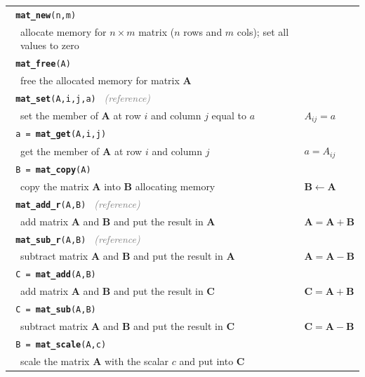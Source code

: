 \documentclass[10pt]{article}
\begin{document}
\begin{longtable}{@{} p{1.5cm} p{7cm} p{3cm} @{}}
\toprule
\multicolumn{2}{l}{\texttt{ \textbf{mat\_new}(n,m) }} \\
& allocate memory for $n\times m$ matrix ($n$ rows and $m$ cols); set all values to zero & \\
\hline
\multicolumn{2}{l}{\texttt{ \textbf{mat\_free}(A)} } \\
& free the allocated memory for matrix $\mathbf{A}$ & \\
\hline
\multicolumn{2}{l}{\texttt{ \textbf{mat\_set}(A,i,j,a) } \hfill \textit{\textcolor{gray}{(reference)}}} \\
& set the member of $\mathbf{A}$ at row $i$ and column $j$ equal to $a$ &
$A_{ij}=a$ \\
\hline
\multicolumn{2}{l}{\texttt{ a = \textbf{mat\_get}(A,i,j) }} \\
& get the member of $\mathbf{A}$ at row $i$ and column $j$ &
$a=A_{ij}$ \\
\hline
\multicolumn{2}{l}{\texttt{ B = \textbf{mat\_copy}(A) }} \\
& copy the matrix $\mathbf{A}$ into $\mathbf{B}$ allocating memory & 
$\mathbf{B} \gets \mathbf{A}$ \\
\hline
\multicolumn{2}{l}{\texttt{ \textbf{mat\_add\_r}(A,B) } \hfill \textit{\textcolor{gray}{(reference)}}} \\
& add matrix $\mathbf{A}$ and $\mathbf{B}$ and put the result in $\mathbf{A}$ &
$\mathbf{A}=\mathbf{A}+\mathbf{B}$ \\
\hline
\multicolumn{2}{l}{\texttt{ \textbf{mat\_sub\_r}(A,B) } \hfill \textit{\textcolor{gray}{(reference)}}} \\
& subtract matrix $\mathbf{A}$ and $\mathbf{B}$ and put the result in $\mathbf{A}$ &
$\mathbf{A}=\mathbf{A}-\mathbf{B}$ \\
\hline
\multicolumn{2}{l}{\texttt{ C = \textbf{mat\_add}(A,B) }} \\
& add matrix $\mathbf{A}$ and $\mathbf{B}$ and put the result in $\mathbf{C}$ &
$\mathbf{C}=\mathbf{A}+\mathbf{B}$ \\
\hline
\multicolumn{2}{l}{\texttt{ C = \textbf{mat\_sub}(A,B) }} \\
& subtract matrix $\mathbf{A}$ and $\mathbf{B}$ and put the result in $\mathbf{C}$ &
$\mathbf{C}=\mathbf{A}-\mathbf{B}$ \\
\hline
\multicolumn{2}{l}{\texttt{ B = \textbf{mat\_scale}(A,c) }} \\
& scale the matrix $\mathbf{A}$ with the scalar $c$ and put into $\mathbf{C}$ &

\end{longtable}
\end{document}
